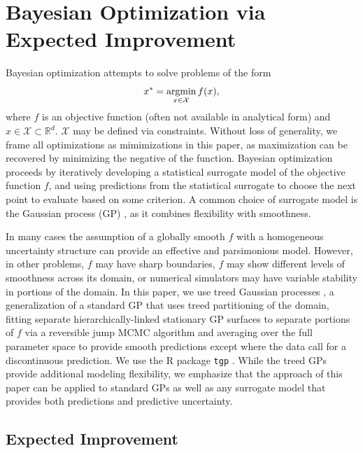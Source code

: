 \documentclass{article}
\newcommand{\argmin}{\operatornamewithlimits{argmin}}
\begin{document}
%
%
\section{Bayesian Optimization via Expected Improvement}
\label{sec:gp}
%
%

Bayesian optimization attempts to solve problems of the form
\[
x^* = \argmin_{x\in\mathcal{X}} f(x),
\]
where $f$ is an objective function (often not available in analytical
form) and $x\in\mathcal{X}\subset\mathbb{R}^d$. $\mathcal{X}$ may be
defined via constraints. Without loss of generality, we frame all
optimizations as mimimizations in this paper, as maximization can be
recovered by minimizing the negative of the function. Bayesian
optimization proceeds by iteratively
developing a statistical surrogate model of the objective
function $f$, and using predictions from the statistical surrogate to
choose the next point to evaluate based on some criterion. A
common choice of surrogate model is the Gaussian process (GP)
\cite{gramacy:2020,TonyBook}, as it combines flexibility with smoothness.

In many cases the assumption of a globally smooth $f$ with a homogeneous 
uncertainty structure can provide an effective and parsimonious
model. However, in other problems, $f$ may have 
sharp boundaries, $f$ may show different levels of smoothness across
its domain, or numerical simulators may have variable stability in 
portions of the domain. In this paper, we use treed Gaussian
processes \cite{gpJasa}, a generalization of a standard GP that uses
treed partitioning of the domain, fitting separate hierarchically-linked stationary GP 
surfaces to separate portions of $f$ via a reversible jump MCMC 
algorithm and 
averaging over the full parameter space to provide smooth predictions except 
where the data call for a discontinuous prediction. We use the R package 
\verb|tgp| \citep{tgp, tgp2}. While the treed GPs provide additional
modeling flexibility, we emphasize that the approach of this paper can
be applied to standard GPs as well as any surrogate model that
provides both predictions and predictive uncertainty.



%
%
\subsection{Expected Improvement}
%
%
\end{document}
